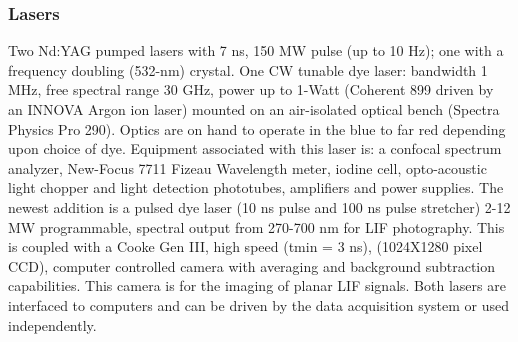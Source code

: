 \documentclass[11pt]{article}
\begin{document}
\subsubsection{Lasers}
Two Nd:YAG pumped lasers with 7 ns, 150 MW pulse (up to 10 Hz); one with a frequency doubling (532-nm) crystal.  One CW tunable dye laser: bandwidth 1 MHz, free spectral range 30 GHz, power up to 1-Watt (Coherent 899 driven by an INNOVA Argon ion laser) mounted on an air-isolated optical bench (Spectra Physics Pro 290).  Optics are on hand to operate in the blue to far red depending upon choice of dye. Equipment associated with this laser is: a confocal spectrum analyzer, New-Focus 7711 Fizeau Wavelength meter, iodine cell, opto-acoustic light chopper and light detection phototubes, amplifiers and power supplies.  The newest addition is a pulsed dye laser (10 ns pulse and 100 ns pulse stretcher) 2-12 MW programmable, spectral output from 270-700 nm for LIF photography.  This is coupled with a Cooke Gen III, high speed (tmin = 3 ns), (1024X1280 pixel CCD), computer controlled camera with averaging and background subtraction capabilities.  This camera is for the imaging of planar LIF signals. Both lasers are interfaced to computers and can be driven by the data acquisition system or used independently.
\end{document}
